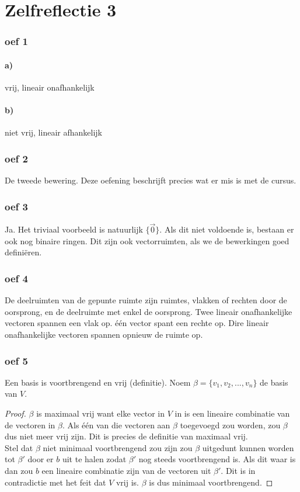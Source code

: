 \documentclass[lineaire_algebra_oplossingen.tex]{subfiles}
\begin{document}
\part{Zelfreflectie 3}
\section{oef 1}
\subsection*{a)}
vrij, lineair onafhankelijk
\subsection*{b)}
niet vrij, lineair afhankelijk
\section{oef 2}
De tweede bewering. Deze oefening beschrijft precies wat er mis is met de cursus.
\section{oef 3}
Ja. Het triviaal voorbeeld is natuurlijk $\{\vec{0}\}$. Als dit niet voldoende is, bestaan er ook nog binaire ringen. Dit zijn ook vectorruimten, als we de bewerkingen goed defini\"eren.
\section{oef 4}
De deelruimten van de gepunte ruimte zijn ruimtes, vlakken of rechten door de oorsprong, en de deelruimte met enkel de oorsprong. Twee lineair onafhankelijke vectoren spannen een vlak op. één vector spant een rechte op. Dire lineair onafhankelijke vectoren spannen opnieuw de ruimte op. 
\section{oef 5}
Een basis is voortbrengend en vrij (definitie). Noem $\beta = \{v_1,v_2,...,v_n\}$ de basis van $V$.
\begin{proof}
$\beta$ is maximaal vrij want elke vector in $V$ in is een lineaire combinatie van de vectoren in $\beta$. Als één van die vectoren aan $\beta$ toegevoegd zou worden, zou $\beta$ dus niet meer vrij zijn. Dit is precies de definitie van maximaal vrij.\\
Stel dat $\beta$ niet minimaal voortbrengend zou zijn zou $\beta$ uitgedunt kunnen worden tot $\beta'$ door er $b$ uit te halen zodat $\beta'$ nog steeds voortbrengend is. Als dit waar is dan zou $b$ een lineaire combinatie zijn van de vectoren uit $\beta'$. Dit is in contradictie met het feit dat $V$ vrij is. $\beta$ is dus minimaal voortbrengend.
\end{proof}
\end{document}
